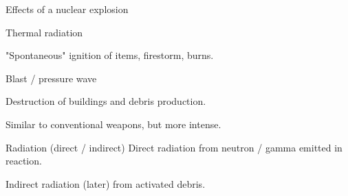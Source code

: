 \documentclass[presentation]{beamer}
\begin{document}
\begin{frame}[label=sec-7-4]{Effects of a nuclear explosion}
\begin{alertblock}{Thermal radiation}

"Spontaneous" ignition of items, firestorm, burns.
\end{alertblock}

\begin{alertblock}{Blast / pressure wave}

Destruction of buildings and debris production.

Similar to conventional weapons, but more intense.
\end{alertblock}

\begin{alertblock}{Radiation (direct / indirect)}
Direct radiation from neutron / gamma emitted in reaction.

Indirect radiation (later) from activated debris.
\end{alertblock}
\end{frame}
\end{document}

